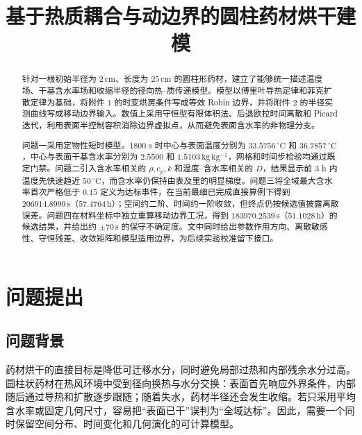 \documentclass[withoutpreface,bwprint]{cumcmthesis}
\title{基于热质耦合与动边界的圆柱药材烘干建模}
\begin{document}
\maketitle
\begin{abstract}
针对一根初始半径为 $2\,\mathrm{cm}$、长度为 $25\,\mathrm{cm}$ 的圆柱形药材，建立了能够统一描述温度场、干基含水率场和收缩半径的径向热--质传递模型。模型以傅里叶导热定律和菲克扩散定律为基础，将附件 1 的时变烘房条件写成等效 Robin 边界，并将附件 2 的半径实测曲线写成移动边界输入。数值上采用守恒型有限体积法、后退欧拉时间离散和 Picard 迭代，利用表面半控制容积消除边界虚拟点，从而避免表面含水率的非物理分支。

问题一采用定物性短时模型。1800 s 时中心与表面温度分别为 $33.5756\,^{\circ}\mathrm{C}$ 和 $36.7857\,^{\circ}\mathrm{C}$，中心与表面干基含水率分别为 $2.5500$ 和 $1.5103\,\mathrm{kg\,kg^{-1}}$，网格和时间步检验均通过既定门禁。问题二引入含水率相关的 $\rho,c_p,k$ 和温度--含水率相关的 $D$，结果显示前 3 h 内温度先快速趋近 $50\,^{\circ}\mathrm{C}$，而含水率仍保持由表及里的明显梯度。问题三将全域最大含水率首次严格低于 $0.15$ 定义为达标事件，在当前最细已完成直接算例下得到 $206914.8999\,\mathrm{s}$（$57.4764\,\mathrm{h}$）；空间约二阶、时间约一阶收敛，但终点仍按候选值披露离散误差。问题四在材料坐标中独立重算移动边界工况，得到 $183970.2539\,\mathrm{s}$（$51.1028\,\mathrm{h}$）的候选结果，并给出约 $\pm70\,\mathrm{s}$ 的保守不确定度。文中同时给出参数作用方向、离散敏感性、守恒残差、收敛矩阵和模型适用边界，为后续实验校准留下接口。

\end{abstract}

\setcounter{page}{1}
\section{问题提出}
\subsection{问题背景}
药材烘干的直接目标是降低可迁移水分，同时避免局部过热和内部残余水分过高。圆柱状药材在热风环境中受到径向换热与水分交换：表面首先响应外界条件，内部随后通过导热和扩散逐步跟随；随着失水，药材半径还会发生收缩。若只采用平均含水率或固定几何尺寸，容易把“表面已干”误判为“全域达标”。因此，需要一个同时保留空间分布、时间变化和几何演化的可计算模型。
\end{document}
